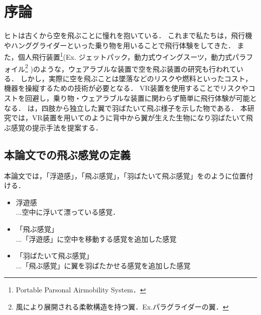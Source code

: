 \chapter[序論]%
        {序論}



        ヒトは古くから空を飛ぶことに憧れを抱いている．
        これまで私たちは，飛行機やハンググライダーといった乗り物を用いることで飛行体験をしてきた．
        また，個人飛行装置\footnote{Portable Parsonal Airmobility System．}(Ex. ジェットパック，動力式ウイングスーツ，動力式パラフォイル\footnote{風により展開される柔軟構造を持つ翼．Ex.パラグライダーの翼．}
        )のような，ウェアラブルな装置で空を飛ぶ装置の研究も行われている\cite{gravityindustries}．
        しかし，実際に空を飛ぶことは墜落などのリスクや燃料といったコスト，機器を操縦するための技術が必要となる．
        VR装置を使用することでリスクやコストを回避し，乗り物・ウェアラブルな装置に関わらず簡単に飛行体験が可能となる．
        は，四肢から独立した翼で羽ばたいて飛ぶ様子を示した物である．
        本研究では，VR装置を用いてのように背中から翼が生えた生物になり羽ばたいて飛ぶ感覚の提示手法を提案する．

\section{本論文での飛ぶ感覚の定義}
        本論文では，「浮遊感」，「飛ぶ感覚」，「羽ばたいて飛ぶ感覚」をのように位置付ける．

        \begin{itemize}
                \item 浮遊感\\
                ...空中に浮いて漂っている感覚．
                \item 「飛ぶ感覚」\\
                ...「浮遊感」に空中を移動する感覚を追加した感覚
                \item 「羽ばたいて飛ぶ感覚」\\
                ...「飛ぶ感覚」に翼を羽ばたかせる感覚を追加した感覚
        \end{itemize}

